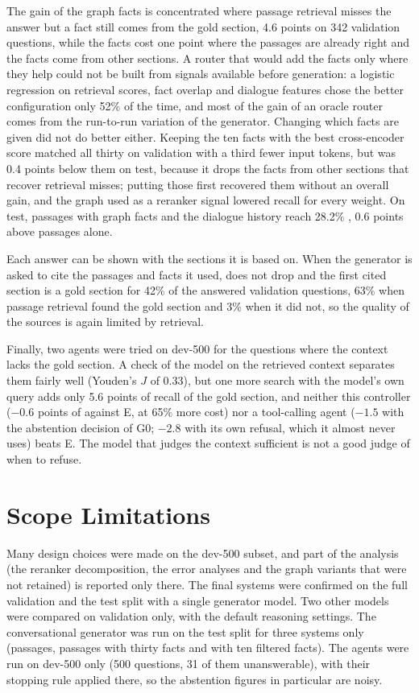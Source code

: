 The gain of the graph facts is concentrated where passage retrieval misses the answer but a
fact still comes from the gold section, 4.6 points on 342 validation questions, while the
facts cost one point where the passages are already right and the facts come from other
sections. A router that would add the facts only where they help could not be built from
signals available before generation: a logistic regression on retrieval scores, fact
overlap and dialogue features chose the better configuration only 52\% of the time, and most
of the gain of an oracle router comes from the run-to-run variation of the generator.
Changing which facts are given did not do better either. Keeping the ten facts with the best
cross-encoder score matched all thirty on validation with a third fewer input tokens, but was
0.4 points below them on test, because it drops the facts from other sections that recover
retrieval misses; putting those first recovered them without an overall gain, and the graph
used as a reranker signal lowered recall for every weight. On test, passages with graph facts
and the dialogue history reach 28.2\% \fone{}, 0.6 points above passages alone.

Each answer can be shown with the sections it is based on. When the generator is asked to cite
the passages and facts it used, \fone{} does not drop and the first cited section is a gold section
for 42\% of the answered validation questions, 63\% when passage retrieval found the gold section
and 3\% when it did not, so the quality of the sources is again limited by retrieval.

Finally, two agents were tried on dev-500 for the questions where the context lacks the gold
section. A check of the model on the retrieved context separates them fairly well (Youden's $J$ of
0.33), but one more search with the model's own query adds only 5.6 points of recall of the gold
section, and neither this controller ($-0.6$ points of \fone{} against E, at 65\% more cost) nor a
tool-calling agent ($-1.5$ with the abstention decision of G0; $-2.8$ with its own refusal, which
it almost never uses) beats E. The model that judges the context sufficient is not a good judge of
when to refuse.


\section*{Scope Limitations}

Many design choices were made on the dev-500 subset, and part of the analysis (the
reranker decomposition, the error analyses and the graph variants that were not
retained) is reported only there. The final systems were confirmed on the full
validation and the test split with a single generator model. Two other models were compared
on validation only, with the default reasoning settings. The conversational generator was
run on the test split for three systems only (passages, passages with thirty facts and with
ten filtered facts). The agents were run on dev-500 only (500 questions, 31 of them unanswerable),
with their stopping rule applied there, so the abstention figures in particular are noisy.

